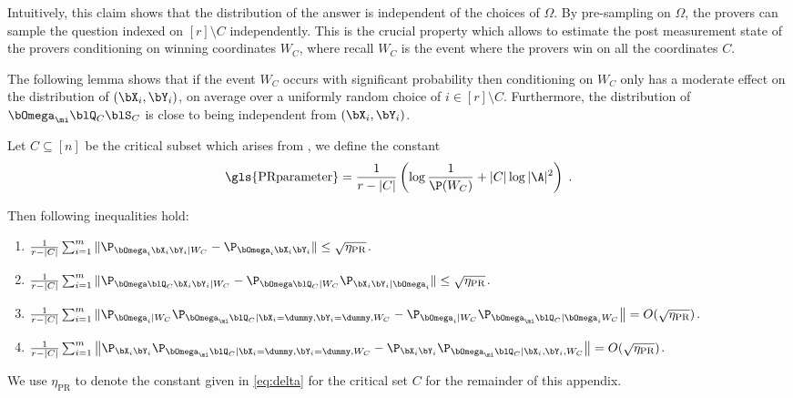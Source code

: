 Intuitively, this claim shows that the distribution of the answer is independent of the choices of $\Omega$. By pre-sampling on $\Omega$, the provers can sample the question indexed on $[r] \setminus C$ independently. This is the crucial property which allows to estimate the post measurement state of the provers conditioning on winning coordinates $W_C$, where recall $W_C$ is the event where the provers win on all the coordinates $C$. 

The following lemma shows that if the event $W_C$ occurs with significant probability then conditioning on $W_C$ only has a moderate effect on the distribution of $(\bX_i, \bY_i)$, on average over a uniformly random choice of $i \in [r] \setminus C$. Furthermore, the distribution of $\bOmega_\mi \blQ_C\blS_C$ is close to being independent from $(\bX_i,\bY_i)$. 

\begin{lemma}
	\label{lem:classical_skew}
	Let $C\subseteq [n]$ be the critical subset which arises from , we define the constant
	\begin{equation}\label{eq:delta}
		\text{\gls{PRparameter}} = \frac{1}{r-|C|} \left ( \log \frac{1}{\P(W_C)} + |C| \log |\A|^2 \right)\;.
	\end{equation}
	
	Then following inequalities hold:
	\begin{enumerate}
		\item $ \frac{1}{r-|C|}\sum_{i=1}^m \| \P_{\bOmega_i \bX_i \bY_i | W_C} -  \P_{\bOmega_i \bX_i \bY_i} \| \leq \sqrt{\eta_{\text{PR}}}$.
		\item $ \frac{1}{r-|C|}\sum_{i=1}^m\|  \P_{\bOmega \blQ_C \bX_i \bY_i | W_C} -  \P_{\bOmega \blQ_C |W_C} \P_{\bX_i \bY_i | \bOmega_i } \| \leq \sqrt{\eta_{\text{PR}}}$.
		\item $ \frac{1}{r-|C|}\sum_{i=1}^m\| \P_{\bOmega_i |W_C} \P_{\bOmega_\mi \blQ_C | \bX_i = \dummy, \bY_i = \dummy, W_C} -\P_{\bOmega_i | W_C} \P_{\bOmega_\mi \blQ_C |\bOmega_i  W_C}  \big \| = O(\sqrt{\eta_{\text{PR}}})$.
		\item $ \frac{1}{r-|C|}\sum_{i=1}^m\big\|  \P_{\bX_i \bY_i}  \P_{\bOmega_\mi \blQ_C | \bX_i = \dummy, \bY_i = \dummy, W_C} -  \P_{\bX_i \bY_i}  \P_{\bOmega_\mi \blQ_C | \bX_i, \bY_i, W_C} \big\| = O(\sqrt{\eta_{\text{PR}}})$.
	\end{enumerate}
\end{lemma}

We use $\eta_{\text{PR}}$ to denote the constant given in \eqref{eq:delta} for the critical set $C$ for the remainder of this appendix. 


